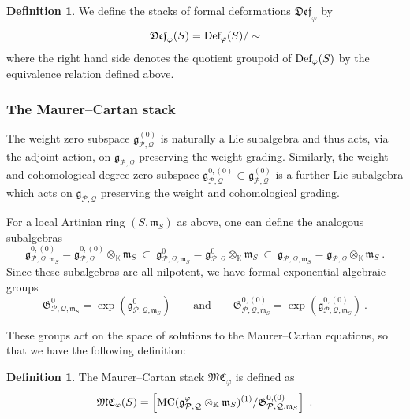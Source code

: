 \documentclass[11pt]{amsart}
\numberwithin{equation}{section}
\theoremstyle{definition}
\newtheorem{defn}[theo]{Definition}
\newcommand{\bb}{\mathbb}
\newcommand{\mc}{\mathcal}
\newcommand{\mf}{\mathfrak}
\newcommand{\Def}{{\textup{Def}}}
\newcommand{\fDef}{{\mathfrak{Def}}}
\newcommand{\K}{{\bb K}}
\newcommand{\Alg}{{\textup{Alg}}}
\newcommand{\MC}{{{\textup{MC}}}}
\newcommand{\fMC}{{{\mathfrak{MC}}}}
\newcommand{\0}{{\textbf{0}}}
\newcommand{\id}{{\textup{id}}}
\newcommand{\g}{{\mf{g}}}
\def\PP{{\mc P}}
\def\QQ{{\mc Q}}
\def\gf{\mathfrak{g}}
\def \mf{\mathfrak}
\def \id{\mathbbm{1}}
\begin{document}


\begin{defn}\label{fDefdefn}
We define the stacks of formal deformations $\fDef_\varphi$ by
	\begin{equation}\label{fDefeqn}
		\fDef_\varphi(S) = \Def_{\varphi}(S) / \sim  
	\end{equation}
	where the right hand side denotes the quotient groupoid of $\Def_{\varphi}(S)$ by the equivalence relation defined above.
\end{defn}

\subsubsection{The Maurer--Cartan stack}

The weight zero subspace $\g_{\mc P,\mc Q}^{(0)}$ is naturally a Lie subalgebra and thus acts, via the adjoint action, on $\g_{\mc P,\mc Q}$ preserving the weight grading. Similarly, the weight and cohomological degree zero subspace $\g_{\mc P,\mc Q}^{0,(0)}\subset \gf_{\PP, \QQ}^{(0)}$ is a further Lie subalgebra which acts on $\g_{\mc P,\mc Q}$ preserving the weight and cohomological grading.



For a local Artinian ring $(S,\mf m_S)$ as above, one can define the analogous subalgebras 
\[ 
\g_{\mc P,\mc Q,\mf m_S}^{0,(0)} = \g_{\mc P,\mc Q}^{0,(0)} \otimes_{ \K}\mf m_S\  \subset \ \g_{\mc P,\mc Q,\mf m_S}^0 = \g_{\mc P,\mc Q}^0\otimes_{ \K}\mf m_S \ \subset \  \g_{\mc P,\mc Q,\mf m_S} = \g_{\mc P,\mc Q}\otimes_{ \K}\mf m_S   ~.
\]
Since these subalgebras are all nilpotent, we have formal exponential algebraic groups
\[
\mf G_{\PP,\QQ,\mf m_S}^0 = \exp(\gf_{\PP,\QQ,\mf m_S}^0) \qquad \text{and}\qquad \mf G_{\PP,\QQ,\mf m_S}^{0,(0)} = \exp(\gf_{\PP,\QQ,\mf m_S}^{0,(0)})~.
\]

These groups act on the space of solutions to the Maurer--Cartan equations, so that we have the following definition:
\begin{defn}\label{fMCdefn}
The Maurer--Cartan stack $\fMC_\varphi$ is defined as  	
\begin{equation}\label{MCstackeqn}
		\fMC_\varphi(S) =\left[ \MC( \g^\varphi_{\mc P, \mc Q}\otimes_{\bb K} \mf m_S)^{(1)}/\mf G_{\mc P,\mc Q,\mf m_S}^{0,(0)}\right]   \ .
	\end{equation}
\end{defn} 
\end{document}
